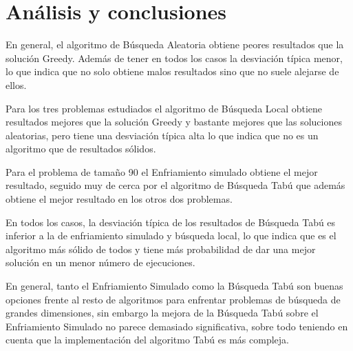 \documentclass[runningheads,a4paper]{llncs}
\begin{document}
\section{Análisis y conclusiones}

En general, el algoritmo de Búsqueda Aleatoria obtiene peores resultados que la solución Greedy. Además de tener en todos los casos la desviación típica menor, lo que indica que no solo obtiene malos resultados sino que no suele alejarse de ellos.

Para los tres problemas estudiados el algoritmo de Búsqueda Local obtiene resultados mejores que la solución Greedy y bastante mejores que las soluciones aleatorias, pero tiene una desviación típica alta lo que indica que no es un algoritmo que de resultados sólidos.

Para el problema de tamaño 90 el Enfriamiento simulado obtiene el mejor resultado, seguido muy de cerca por el algoritmo de Búsqueda Tabú que además obtiene el mejor resultado en los otros dos problemas. 

En todos los casos, la desviación típica de los resultados de Búsqueda Tabú es inferior a la de enfriamiento simulado y búsqueda local, lo que indica que es el algoritmo más sólido de todos y tiene más probabilidad de dar una mejor solución en un menor número de ejecuciones.

En general, tanto el Enfriamiento Simulado como la Búsqueda Tabú son buenas opciones frente al resto de algoritmos para enfrentar problemas de búsqueda de grandes dimensiones, sin embargo la mejora de la Búsqueda Tabú sobre el Enfriamiento Simulado no parece demasiado significativa, sobre todo teniendo en cuenta que la implementación del algoritmo Tabú es más compleja.
\end{document}
